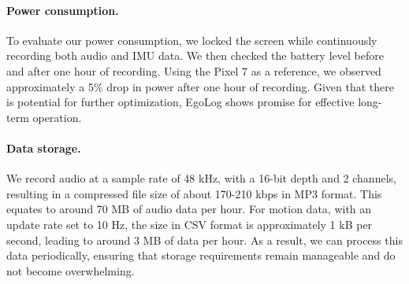 \paragraph{Power consumption.}
To evaluate our power consumption, we locked the screen while continuously recording both audio and IMU data. We then checked the battery level before and after one hour of recording. Using the Pixel 7 as a reference, we observed approximately a 5\% drop in power after one hour of recording. Given that there is potential for further optimization, EgoLog shows promise for effective long-term operation.

\paragraph{Data storage.}
We record audio at a sample rate of 48 kHz, with a 16-bit depth and 2 channels, resulting in a compressed file size of about 170-210 kbps in MP3 format. This equates to around 70 MB of audio data per hour. For motion data, with an update rate set to 10 Hz, the size in CSV format is approximately 1 kB per second, leading to around 3 MB of data per hour.
As a result, we can process this data periodically, ensuring that storage requirements remain manageable and do not become overwhelming.




